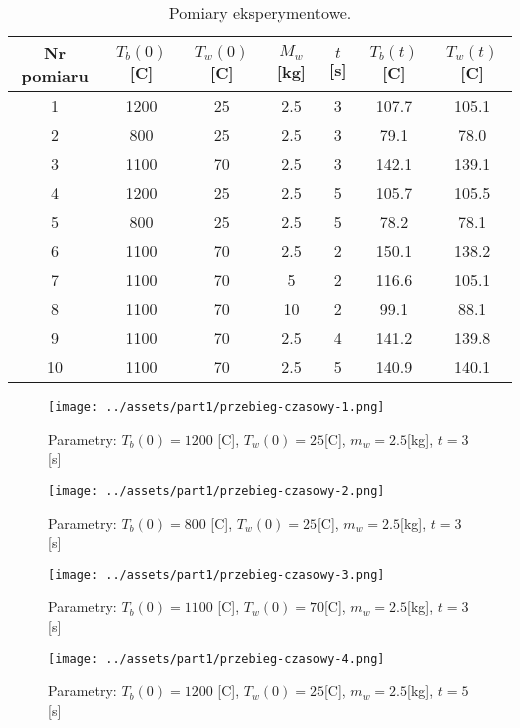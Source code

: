 \documentclass[
	12pt, %
]{fphw}
\begin{document}
\begin{table}[H]
	\begin{tabular}{ |c|c|c|c|c|c|c| }
		\hline
		 Nr pomiaru  & \( T_b(0) \) [\textdegree{}C] &  \( T_w(0) \) [\textdegree{}C] & \(M_w\) [kg] & \(t\)[s] &  \( T_b(t) \) [\textdegree{}C]  & \( T_w(t) \) [\textdegree{}C] \\
		\hline
		 1  & 1200 & 25 & 2.5 & 3 & 107.7 & 105.1  \\
		\hline
		 2  & 800 & 25 & 2.5 & 3 & 79.1 & 78.0  \\
		\hline
		 3  & 1100 & 70 & 2.5 & 3 & 142.1 & 139.1  \\
		\hline
		 4  & 1200 & 25 & 2.5 & 5 & 105.7 & 105.5  \\
		\hline
		 5  & 800 & 25 & 2.5 & 5 & 78.2 & 78.1  \\
		\hline
		 6  & 1100 & 70 & 2.5 & 2 & 150.1 & 138.2  \\
		\hline
		 7  & 1100 & 70 & 5 & 2 & 116.6 & 105.1  \\
		\hline
		 8  & 1100 & 70 & 10 & 2 & 99.1 & 88.1  \\
		\hline
		 9  & 1100 & 70 & 2.5 & 4 & 141.2 & 139.8  \\
		\hline
		 10  & 1100 & 70 & 2.5 & 5 & 140.9 & 140.1  \\
		\hline
	\end{tabular}
	\caption{Pomiary eksperymentowe.}
\end{table}


\begin{figure}[H]
	\texttt{[image: ../assets/part1/przebieg-czasowy-1.png]}
	\caption{Parametry: \(T_b(0) = 1200\) [\textdegree{}C], \(T_w(0) = 25\)[\textdegree{}C], \(m_w = 2.5\)[kg], \(t = 3\)[s]}

	\texttt{[image: ../assets/part1/przebieg-czasowy-2.png]}
	\caption{Parametry: \(T_b(0) = 800\) [\textdegree{}C], \(T_w(0) = 25\)[\textdegree{}C], \(m_w = 2.5\)[kg], \(t = 3\)[s]}
\end{figure}


\begin{figure}[H]
	\texttt{[image: ../assets/part1/przebieg-czasowy-3.png]}
	\caption{Parametry: \(T_b(0) = 1100\) [\textdegree{}C], \(T_w(0) = 70\)[\textdegree{}C], \(m_w = 2.5\)[kg], \(t = 3\)[s]}

	\texttt{[image: ../assets/part1/przebieg-czasowy-4.png]}
	\caption{Parametry: \(T_b(0) = 1200\) [\textdegree{}C], \(T_w(0) = 25\)[\textdegree{}C], \(m_w = 2.5\)[kg], \(t = 5\)[s]}
\end{figure}
\end{document}
